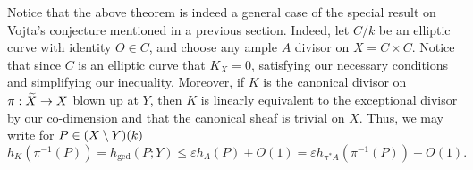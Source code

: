 Notice that the above theorem is indeed a general case of the special result on Vojta's conjecture mentioned in a previous section.
Indeed, let $C/k$ be an elliptic curve with identity $O \in C$,
and choose any ample $A$ divisor on $X = C \times C$.
Notice that since $C$ is an elliptic curve that $K_X = 0$,
satisfying our necessary conditions and simplifying our inequality.
Moreover, if $K$ is the canonical divisor on $\pi: \widetilde X \to X$ blown up at $Y$,
then $K$ is linearly equivalent to the exceptional divisor by our co-dimension and that the canonical sheaf is trivial on $X$.
Thus, we may write for $P \in (X \setminus Y)(k)$
\[
    h_K(\pi^{-1}(P)) 
    = h_{\gcd}(P; Y) 
    \leq \varepsilon h_A(P) + O(1)
    = \varepsilon h_{\pi^* A}(\pi^{-1}(P)) + O(1).
\]